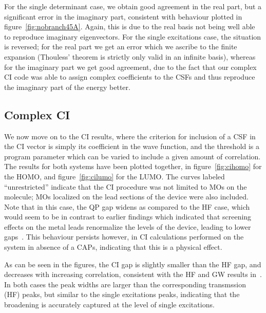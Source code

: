 For the single determinant case, we obtain good agreement in the real part, but
a significant error in the imaginary part, consistent with behaviour plotted in
figure~\ref{fig:nobranch45A}. Again, this is due to the real basis not being 
well able to reproduce imaginary eigenvectors. For the single excitations case,
the situation is reversed; for the real part we get an error which we ascribe
to the finite expansion (Thouless' theorem is strictly only valid in an
infinite basis), whereas for the imaginary part we get good agreement, due to
the fact that our complex \ac{CI} code was able to assign complex coefficients
to the \acp{CSF} and thus reproduce the imaginary part of the energy better.

\subsection{Complex \ac{CI}}

We now move on to the \ac{CI} results, where the criterion for inclusion of a
\ac{CSF} in the \ac{CI} vector is simply its coefficient in the wave function,
and the threshold is a program parameter which can be varied to include a given
amount of correlation. The results for both systems have been plotted together,
in figure~\ref{fig:cihomo} for the \ac{HOMO}, and figure~\ref{fig:cilumo}
for the \ac{LUMO}. The curves labeled ``unrestricted'' indicate that the \ac{CI}
procedure was not limited to MOs on the molecule; MOs localized on the lead
sections of the device were also included. Note that in this case, the QP gap
widens as compared to the HF case, which would seem to be in contrast to
earlier findings which indicated that screening effects on the metal leads
renormalize the levels of the device, leading to lower
gaps~\cite{thygesen_rubio, thygesen}. This behaviour persists however, in
\ac{CI} calculations performed on the system in absence of a \acp{CAP},
indicating that this is a physical effect.

As can be seen in the figures, the \ac{CI} gap is slightly smaller than the HF
gap, and decreases with increasing correlation, consistent with the HF and GW
results in~\cite{thygesen_rubio, thygesenrubio2010corr}. In both cases the peak
widths are larger than the corresponding transmssion (HF) peaks, but similar
to the single excitations peaks, indicating that the broadening is accurately
captured at the level of single excitations.

